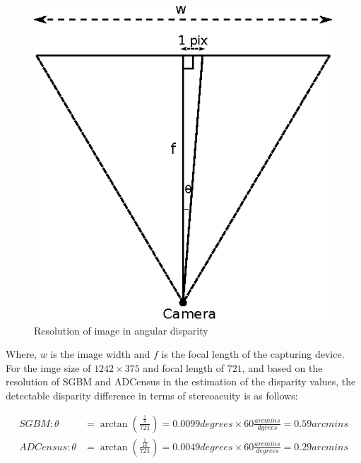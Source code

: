 \begin{figure}[H]
\centering
\includegraphics{camRes}
\caption{Resolution of image in angular disparity}
\label{fig:camResolution}
\end{figure}
\noindent
Where, $w$ is the image width and $f$ is the focal length of the capturing device.
For the imge size of $1242\times375$ and focal length of $721$, and based on the resolution of SGBM and ADCensus in the estimation of the disparity values, 
the detectable disparity difference in terms of stereoacuity is as follows:

\begin{align}
\label{eq:algResolution}
SGBM: \theta &= \arctan (\frac{\frac{1}{8}}{721}) = 0.0099 degrees \times 60 \frac{arcmins}{dgrees} = 0.59 arcmins \\
ADCensus: \theta &= \arctan (\frac{\frac{1}{16}}{721}) = 0.0049 degrees \times 60 \frac{arcmins}{degrees}= 0.29 arcmins
\end{align}
